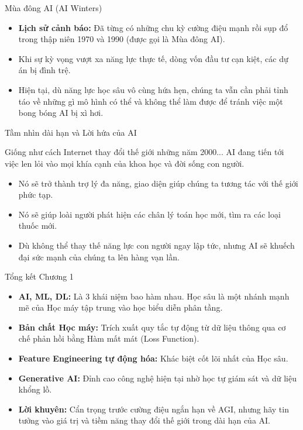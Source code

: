 \documentclass[aspectratio=169]{beamer}
\begin{document}
\begin{frame}{Mùa đông AI (AI Winters)}
    \begin{itemize}
        \item \textbf{Lịch sử cảnh báo:} Đã từng có những chu kỳ cường điệu mạnh rồi sụp đổ trong thập niên 1970 và 1990 (được gọi là Mùa đông AI).
        \item Khi sự kỳ vọng vượt xa năng lực thực tế, dòng vốn đầu tư cạn kiệt, các dự án bị đình trệ.
        \item Hiện tại, dù năng lực học sâu vô cùng hứa hẹn, chúng ta vẫn cần phải tỉnh táo về những gì mô hình có thể và không thể làm được để tránh việc một bong bóng AI bị xì hơi.
    \end{itemize}
\end{frame}

\begin{frame}{Tầm nhìn dài hạn và Lời hứa của AI}
    \begin{block}{Giống như cách Internet thay đổi thế giới những năm 2000...}
        AI đang tiến tới việc len lỏi vào mọi khía cạnh của khoa học và đời sống con người.
    \end{block}
    \begin{itemize}
        \item Nó sẽ trở thành trợ lý đa năng, giao diện giúp chúng ta tương tác với thế giới phức tạp.
        \item Nó sẽ giúp loài người phát hiện các chân lý toán học mới, tìm ra các loại thuốc mới.
        \item Dù không thể thay thế năng lực con người ngay lập tức, nhưng AI sẽ khuếch đại sức mạnh của chúng ta lên hàng vạn lần.
    \end{itemize}
\end{frame}

\begin{frame}{Tổng kết Chương 1}
    \begin{itemize}
        \item \textbf{AI, ML, DL:} Là 3 khái niệm bao hàm nhau. Học sâu là một nhánh mạnh mẽ của Học máy tập trung vào học biểu diễn phân tầng.
        \item \textbf{Bản chất Học máy:} Trích xuất quy tắc tự động từ dữ liệu thông qua cơ chế phản hồi bằng Hàm mất mát (Loss Function).
        \item \textbf{Feature Engineering tự động hóa:} Khác biệt cốt lõi nhất của Học sâu.
        \item \textbf{Generative AI:} Đỉnh cao công nghệ hiện tại nhờ học tự giám sát và dữ liệu khổng lồ.
        \item \textbf{Lời khuyên:} Cẩn trọng trước cường điệu ngắn hạn về AGI, nhưng hãy tin tưởng vào giá trị và tiềm năng thay đổi thế giới trong dài hạn của AI.
    \end{itemize}
\end{frame}
\end{document}

